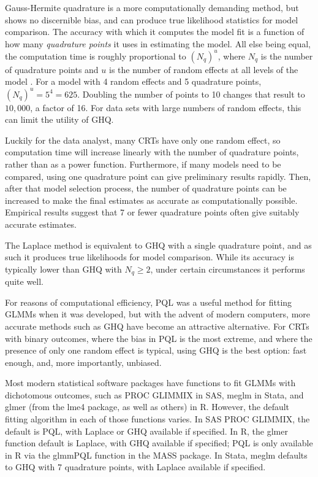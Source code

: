 \documentclass{article}
\begin{document}
\begin{flushleft}
Gauss-Hermite quadrature is a more computationally demanding method, but shows no discernible bias, and can produce true likelihood statistics for model comparison. The accuracy with which it computes the model fit is a function of how many \textit{quadrature points} it uses in estimating the model. All else being equal, the computation time is roughly proportional to $(N_q)^u$, where $N_q$ is the number of quadrature points and $u$ is the number of random effects at all levels of the model \cite{statacorp_stata_2017}\cite{pinheiro_efficient_2006}. For a model with 4 random effects and 5 quadrature points, $(N_q)^u = 5^4 = 625$. Doubling the number of points to 10 changes that result to $10,000$, a factor of 16. For data sets with large numbers of random effects, this can limit the utility of GHQ.

Luckily for the data analyst, many CRTs have only one random effect, so computation time will increase linearly with the number of quadrature points, rather than as a power function. Furthermore, if many models need to be compared, using one quadrature point can give preliminary results rapidly. Then, after that model selection process, the number of quadrature points can be increased to make the final estimates as accurate as computationally possible. Empirical results suggest that 7 or fewer quadrature points often give suitably accurate estimates\cite{pinheiro_approximations_1995}.

The Laplace method is equivalent to GHQ with a single quadrature point\cite{liu_note_1994}, and as such it produces true likelihoods for model comparison. While its accuracy is typically lower than GHQ with $N_q\geq2$, under certain circumstances it performs quite well\cite{liu_note_1994}.

For reasons of computational efficiency, PQL was a useful method for fitting GLMMs when it was developed, but with the advent of modern computers, more accurate methods such as GHQ have become an attractive alternative. For CRTs with binary outcomes, where the bias in PQL is the most extreme\cite{ng_estimation_2006}\cite{lin_estimation_2007}, and where the presence of only one random effect is typical, using GHQ is the best option: fast enough, and, more importantly, unbiased.

Most modern statistical software packages have functions to fit GLMMs with dichotomous outcomes, such as PROC GLIMMIX in SAS, meglm in Stata, and glmer (from the lme4 package, as well as others) in R. However, the default fitting algorithm in each of those functions varies. In SAS PROC GLIMMIX, the default is PQL, with Laplace or GHQ available if specified. In R, the glmer function default is Laplace, with GHQ available if specified; PQL is only available in R via the glmmPQL function in the MASS package. In Stata, meglm defaults to GHQ with 7 quadrature points, with Laplace available if specified.


\end{flushleft}
\end{document}
